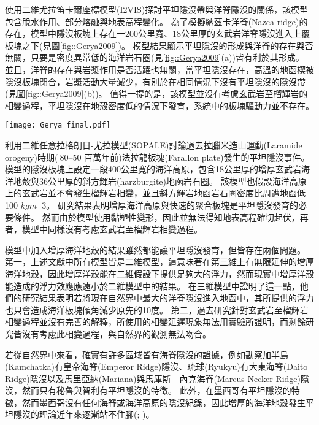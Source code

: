 \citealp{Gerya2009}使用二維尤拉笛卡爾座標模型(I2VIS)探討平坦隱沒帶與洋脊隱沒的關係，該模型包含脫水作用、部分熔融與地表高程變化。
為了模擬納茲卡洋脊(Nazca ridge)的存在，模型中隱沒板塊上存在一200公里寬、18公里厚的玄武岩洋脊隱沒進入上覆板塊之下(見圖\ref{fig::Gerya2009})。
模型結果顯示平坦隱沒的形成與洋脊的存在與否無關，只要是密度異常低的海洋岩石圈(見\ref{fig::Gerya2009}(a))皆有利於其形成。
並且，洋脊的存在與岩漿作用是否活躍也無關，當平坦隱沒存在，高溫的地函楔被隱沒板塊閉合，岩漿活動大量減少，有別於在相同情況下沒有平坦隱沒的隱沒帶(見圖\ref{fig::Gerya2009}(b))。
值得一提的是，該模型並沒有考慮玄武岩至榴輝岩的相變過程，平坦隱沒在地殼密度低的情況下發育，系統中的板塊驅動力並不存在。


\begin{figure*}[ht!]
    \centering
    \texttt{[image: Gerya\_final.pdf]}
    \caption{\citealp{Gerya2009}中模型於第12個百萬年的結果。圖組(a)與圖組(b)分別為隱沒海洋地函岩石圈密度$3100 kgm^{-3}$與$3300 kgm^{-3}$的結果。(a)上圖與(b)上圖為包含洋脊隱沒的模型，(a)(b)下圖為不包含洋脊的模型，圖中白線為等溫線。其中，顏色代表不同岩相：1、2=大陸地殼、3、4=沈積物、5、6=玄武岩、7、8=輝長岩、9、10=無水地函、11=蛇紋岩、12、13、14=含水地函。
    }
    \label{fig::Gerya2009}
\end{figure*}

\citealp{Liu2016}利用二維任意拉格朗日-尤拉模型(SOPALE)討論過去拉臘米造山運動(Laramide orogeny)時期($~$80–50 百萬年前)法拉龍板塊(Farallon plate)發生的平坦隱沒事件。
模型的隱沒板塊上設定一段400公里寬的海洋高原，包含18公里厚的增厚玄武岩海洋地殼與36公里厚的斜方輝岩(harzburgite)地函岩石圈。
該模型也假設海洋高原上的玄武岩並不會發生榴輝岩相變，並且斜方輝岩地函岩石圈密度比周遭地函低100 $kg m^-3$。
研究結果表明增厚海洋高原與快速的聚合板塊是平坦隱沒發育的必要條件。
然而由於模型使用黏塑性變形，因此並無法得知地表高程確切起伏，再者，模型中同樣沒有考慮玄武岩至榴輝岩相變過程。

模型中加入增厚海洋地殼的結果雖然都能讓平坦隱沒發育，但皆存在兩個問題。
第一，上述文獻中所有模型皆是二維模型，這意味著在第三維上有無限延伸的增厚海洋地殼，因此增厚洋殼能在二維假設下提供足夠大的浮力，然而現實中增厚洋殼能造成的浮力效應應遠小於二維模型中的結果。
\citealp{florez2019impact}在三維模型中證明了這一點，他們的研究結果表明若將現在自然界中最大的洋脊隱沒進入地函中，其所提供的浮力也只會造成海洋板塊傾角減少原先的10度。
第二，過去研究針對玄武岩至榴輝岩相變過程並沒有完善的解釋，\citealp{van2002role}所使用的相變延遲現象無法用實驗所證明，而剩餘研究皆沒有考慮此相變過程，與自然界的觀測無法吻合。

若從自然界中來看，確實有許多區域皆有海脊隱沒的證據，例如勘察加半島(Kamchatka)有皇帝海脊(Emperor Ridge)隱沒、琉球(Ryukyu)有大東海脊(Daito Ridge)隱沒以及馬里亞納(Mariana)與馬庫斯—內克海脊(Marcus-Necker Ridge)隱沒，然而只有秘魯與智利有平坦隱沒的特徵。
此外，在墨西哥有平坦隱沒的特徵，然而墨西哥沒有任何海脊或海洋高原的隱沒紀錄，因此增厚的海洋地殼發生平坦隱沒的理論近年來逐漸站不住腳(\citealp{schellart2020control}; \citealp{Schellart2021})。

